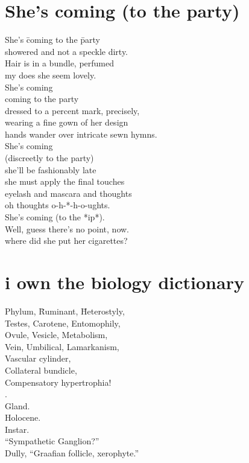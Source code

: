 \documentclass[times,12pt]{book}
\begin{document}
\section*{She's coming (to the party)}
\begin{tabbing}
She's \= coming to the \= party\\
 \> showered and not a speckle dirty.\\
Hair is in a bundle, perfumed\\
 \> my does she seem lovely.\\[10pt]

She's coming\\
 \> coming to the party\\
 \> dressed to a percent mark, precisely,\\
wearing a fine gown of her design\\
  \> hands wander over intricate sewn hymns.\\[10pt]

She's coming\\
 \> (discreetly to the party)\\
she'll be fashionably late\\
she must apply the final touches\\
eyelash and mascara and thoughts\\
oh thoughts o-h-*-h-o-ughts.\\[10pt]

She's coming (to the *ip*).\\
Well, guess there's no point, now.\\
where \> did \> she put her cigarettes?
\end{tabbing}
\newpage

\section*{i own the biology dictionary}
\begin{tabbing}
Phylum, \=Ruminant, \= Heterostyly,\\
\> Testes, Carotene, Entomophily,\\[10pt]

Ovule, Vesicle, Metabolism,\\
\> Vein, Umbilical, Lamarkanism,\\[10pt]

\> Vascular cylinder,\\
\> Collateral bundicle,\\[10pt]

Compensatory hypertrophia!\\[1in]

.\\[0.8in]

Gland.\\[10pt]

\> Holocene.\\[10pt]

\> \> Instar.\\[20pt]

``Sympathetic Ganglion?''\\[10pt]

Dully, ``Graafian follicle, xerophyte.''
\end{tabbing}
\newpage
\end{document}
